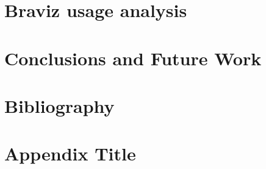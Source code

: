 \documentclass[12pt]{report}
\begin{document}
\chapter{Braviz usage analysis}


\chapter{Conclusions and Future Work}


\chapter*{Bibliography}
\printbibliography

\appendix
\chapter{Appendix Title}
%
\end{document}
